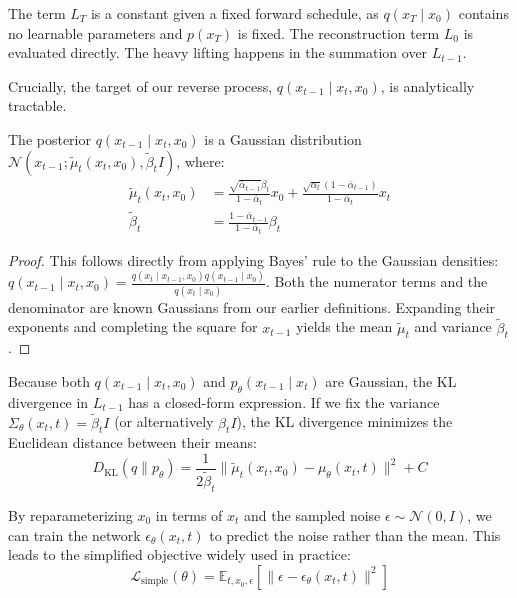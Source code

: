 The term $L_T$ is a constant given a fixed forward schedule, as $q(x_T \mid x_0)$ contains no learnable parameters and $p(x_T)$ is fixed. The reconstruction term $L_0$ is evaluated directly. The heavy lifting happens in the summation over $L_{t-1}$. 

Crucially, the target of our reverse process, $q(x_{t-1} \mid x_t, x_0)$, is analytically tractable.

\begin{lemma}
The posterior $q(x_{t-1} \mid x_t, x_0)$ is a Gaussian distribution $\mathcal{N}(x_{t-1}; \tilde{\mu}_t(x_t, x_0), \tilde{\beta}_t I)$, where:
\begin{align}
    \tilde{\mu}_t(x_t, x_0) &= \frac{\sqrt{\bar{\alpha}_{t-1}} \beta_t}{1 - \bar{\alpha}_t} x_0 + \frac{\sqrt{\alpha_t} (1 - \bar{\alpha}_{t-1})}{1 - \bar{\alpha}_t} x_t \\
    \tilde{\beta}_t &= \frac{1 - \bar{\alpha}_{t-1}}{1 - \bar{\alpha}_t} \beta_t
\end{align}
\end{lemma}
\begin{proof}
This follows directly from applying Bayes' rule to the Gaussian densities: $q(x_{t-1} \mid x_t, x_0) = \frac{q(x_t \mid x_{t-1}, x_0) q(x_{t-1} \mid x_0)}{q(x_t \mid x_0)}$. Both the numerator terms and the denominator are known Gaussians from our earlier definitions. Expanding their exponents and completing the square for $x_{t-1}$ yields the mean $\tilde{\mu}_t$ and variance $\tilde{\beta}_t$.
\end{proof}

Because both $q(x_{t-1} \mid x_t, x_0)$ and $p_\theta(x_{t-1} \mid x_t)$ are Gaussian, the KL divergence in $L_{t-1}$ has a closed-form expression. If we fix the variance $\Sigma_\theta(x_t, t) = \tilde{\beta}_t I$ (or alternatively $\beta_t I$), the KL divergence minimizes the Euclidean distance between their means:
\begin{equation}
    D_{\text{KL}}(q \parallel p_\theta) = \frac{1}{2 \tilde{\beta}_t} \| \tilde{\mu}_t(x_t, x_0) - \mu_\theta(x_t, t) \|^2 + C
\end{equation}

By reparameterizing $x_0$ in terms of $x_t$ and the sampled noise $\epsilon \sim \mathcal{N}(0, I)$, we can train the network $\epsilon_\theta(x_t, t)$ to predict the noise rather than the mean. This leads to the simplified objective widely used in practice:
\begin{equation}
    \mathcal{L}_{\text{simple}}(\theta) = \mathbb{E}_{t, x_0, \epsilon} \left[ \| \epsilon - \epsilon_\theta(x_t, t) \|^2 \right]
\end{equation}

